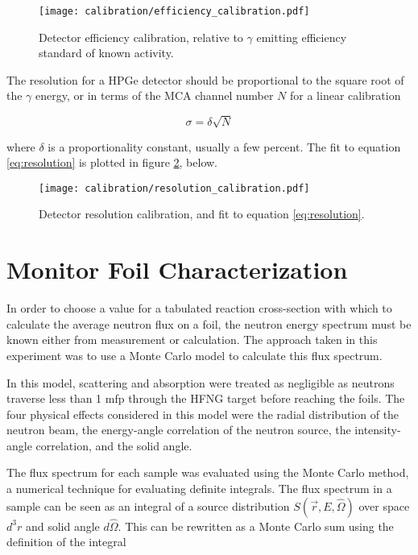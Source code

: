 \documentclass[aps,twocolumn,secnumarabic,balancelastpage,amsmath,amssymb,nofootinbib,floatfix]{revtex4-1}
\begin{document}
\begin{figure}[htb]
\texttt{[image: calibration/efficiency\_calibration.pdf]}
\caption{Detector efficiency calibration, relative to $\gamma$ emitting efficiency standard of known activity.
}
\label{fig:efficiency_calibration}
\end{figure}

The resolution for a HPGe detector should be proportional to the square root of the $\gamma$ energy, or in terms of the MCA channel number $N$ for a linear calibration

\begin{equation}
\sigma = \delta\sqrt{N}
\label{eq:resolution}
\end{equation}

where $\delta$ is a proportionality constant, usually a few percent.  The fit to equation \ref{eq:resolution} is plotted in figure \ref{fig:resolution_calibration}, below.

\begin{figure}[htb]
\texttt{[image: calibration/resolution\_calibration.pdf]}
\caption{Detector resolution calibration, and fit to equation \ref{eq:resolution}.
}
\label{fig:resolution_calibration}
\end{figure}


\section{Monitor Foil Characterization}

In order to choose a value for a tabulated reaction cross-section with which to calculate the average neutron flux on a foil, the neutron energy spectrum must be known either from measurement or calculation.  The approach taken in this experiment was to use a Monte Carlo model to calculate this flux spectrum.

In this model, scattering and absorption were treated as negligible as neutrons traverse less than 1 mfp through the HFNG target before reaching the foils.  The four physical effects considered in this model were the radial distribution of the neutron beam, the energy-angle correlation of the neutron source, the intensity-angle correlation, and the solid angle.

The flux spectrum for each sample was evaluated using the Monte Carlo method, a numerical technique for evaluating definite integrals.  The flux spectrum in a sample can be seen as an integral of a source distribution $S(\vec{r},E,\hat{\Omega})$ over space $d^3r$ and solid angle $d\hat{\Omega}$.  This can be rewritten as a Monte Carlo sum using the definition of the integral
\end{document}
